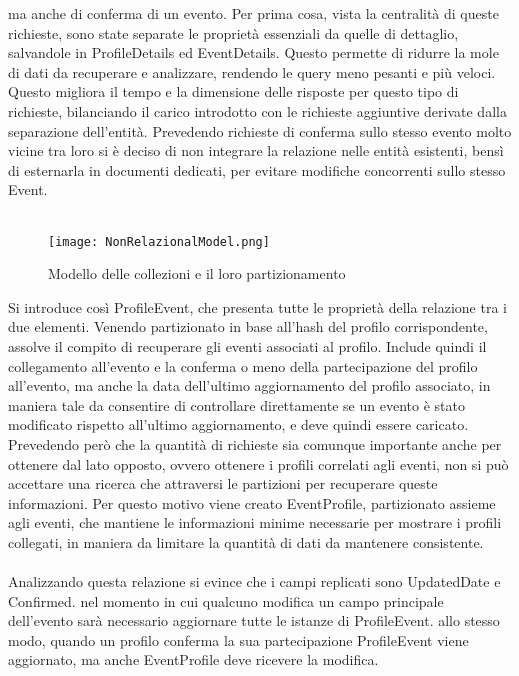 ma anche di conferma di un evento.
Per prima cosa, vista la centralità di queste richieste,
sono state separate le proprietà essenziali da quelle di dettaglio,
salvandole in ProfileDetails ed EventDetails.
Questo permette di ridurre la mole di dati da recuperare e analizzare,
rendendo le query meno pesanti e più veloci.
Questo migliora il tempo e la dimensione delle risposte per questo tipo di richieste,
bilanciando il carico introdotto con le richieste aggiuntive derivate dalla separazione dell'entità.
Prevedendo richieste di conferma sullo stesso evento molto vicine tra loro
si è deciso di non integrare la relazione nelle entità esistenti,
bensì di esternarla in documenti dedicati,
per evitare modifiche concorrenti sullo stesso Event.\\
\\
\begin{figure}[htbp]
    \centering
    \texttt{[image: NonRelazionalModel.png]}
    \caption{Modello delle collezioni e il loro partizionamento}
\end{figure}
Si introduce così ProfileEvent,
che presenta tutte le proprietà della relazione tra i due elementi.
Venendo partizionato in base all'hash del profilo corrispondente,
assolve il compito di recuperare gli eventi associati al profilo.
Include quindi il collegamento all'evento e
la conferma o meno della partecipazione del profilo all'evento,
ma anche la data dell'ultimo aggiornamento del profilo associato,
in maniera tale da consentire di controllare direttamente
se un evento è stato modificato rispetto all'ultimo aggiornamento,
e deve quindi essere caricato.
Prevedendo però che la quantità di richieste sia comunque importante
anche per ottenere dal lato opposto,
ovvero ottenere i profili correlati agli eventi,
non si può accettare una ricerca che attraversi le partizioni per recuperare queste informazioni.
Per questo motivo viene creato EventProfile,
partizionato assieme agli eventi,
che mantiene le informazioni minime necessarie per mostrare i profili collegati,
in maniera da limitare la quantità di dati da mantenere consistente.\\
\\
Analizzando questa relazione si evince che
i campi replicati sono UpdatedDate e Confirmed.
nel momento in cui qualcuno modifica un campo principale dell'evento sarà necessario aggiornare tutte le istanze di ProfileEvent.
allo stesso modo, quando un profilo conferma la sua partecipazione ProfileEvent viene aggiornato,
ma anche EventProfile deve ricevere la modifica.

